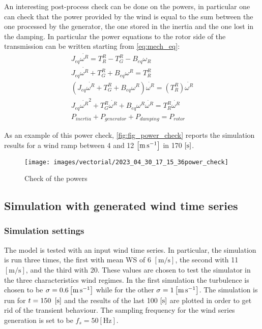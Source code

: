 An interesting post-process check can be done on the powers, in particular one can check that the power provided by the wind is equal to the sum between the one processed by the generator, the one stored in the inertia and the one lost in the damping. In particular the power equations to the rotor side of the transmission can be written starting from \ref{eq:mech_eq}:
\begin{gather}
    J_{eq}\dot{\omega^{R}} = T_R^R - T_G^R-B_{eq}\omega_R\\
    J_{eq}\dot{\omega^{R}} + T_G^R + B_{eq}\omega^R = T_R^R\\
    \left(J_{eq}\dot{\omega^{R}} + T_G^R + B_{eq}\omega^R\right)\dot{\omega^R} = \left(T_R^R\right)\dot{\omega^R}\\
    J_{eq}\dot{\omega^{R}}^2 + T_G^R\dot{\omega^R} + B_{eq}\omega^R\dot{\omega^R} = T_R^R\dot{\omega^R}\\
    P_{inertia} + P_{generator} + P_{damping} = P_{rotor} 
    \label{eq:power_balance}
\end{gather}

As an example of this power check, \autoref{fig:fig_power_check} reports the simulation results for a wind ramp between 4 and 12 $\left[\si{\meter\per\second}\right]$ in 170 $\left[\si{\second}\right]$.
\begin{figure}[htb]
    \centering
    \texttt{[image: images/vectorial/2023\_04\_30\_17\_15\_36power\_check]}
    \caption{Check of the powers}
    \label{fig:fig_power_check}
\end{figure}

\subsection{Simulation with generated wind time series}\label{sec:wind_series_sim}
\subsubsection{Simulation settings}
The model is tested with an input wind time series. In particular, the simulation is run three times, the first with mean \acrshort{WS} of 6 $\left[\si{\meter\per\second}\right]$, the second with  11 $\left[\si{\meter\per\second}\right]$, and the third with 20. These values are chosen to test the simulator in the three characteristics wind regimes. In the first simulation the turbulence is chosen to be $\sigma=0.6 \left[\si{\meter\per\second}\right]$ while for the other $\sigma=1 \left[\si{\meter\per\second}\right]$. The simulation is run for $t=150\ \mesunt{\second}$ and the results of the last 100 $\left[\si{\second}\right]$ are plotted in order to get rid of the transient behaviour. The sampling frequency for the wind series generation is set to be $f_s=50 \left[\si{\hertz}\right]$.

